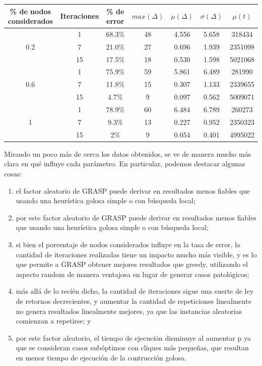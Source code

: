 \begin{center}
    \begin{tabular}{ | c | c | c | c | c | c | c |}
        \hline
        \% de nodos considerados & Iteraciones & \% de error & $max(\Delta)$ & $\mu(\Delta)$ & $\sigma(\Delta)$ & $\mu(t)$ \\ \hline
         & 1 & 68.3\% & 48 & 4.556 & 5.658 & 318434 \\ \cline{2-7}
        0.2 & 7 & 21.0\% & 27 & 0.696 & 1.939 & 2351098\\ \cline{2-7}
         & 15 & 17.5\% & 18 & 0.530 & 1.598 & 5021068 \\ \hline
         & 1 & 75.9\% & 59 & 5.861 & 6.489 & 281990\\ \cline{2-7}
        0.6 & 7 & 11.8\% & 15 & 0.307 & 1.133 & 2339655 \\ \cline{2-7}
         & 15 & 4.7\% & 9 & 0.097 & 0.562 & 5009071 \\ \hline
         & 1 & 78.9\% & 60 & 6.484 & 6.789 & 260273 \\ \cline{2-7}
        1 & 7 & 9.3\% & 13 & 0.227 & 0.952 & 2350323 \\ \cline{2-7}
         & 15 & 2\% & 9 & 0.054 & 0.401 & 4995022 \\
        \hline
    \end{tabular}
\end{center}

Mirando un poco más de cerca los datos obtenidos, se ve de manera mucho más clara en qué influye cada parámetro. En particular, podemos destacar algunas cosas:

\begin{enumerate}
    \item el factor aleatorio de GRASP puede derivar en resultados menos fiables que usando una heurística golosa simple o con búsqueda local;
    \item por este factor aleatorio de GRASP puede derivar en resultados menos fiables que usando una heurística golosa simple o con búsqueda local;
	\item si bien el porcentaje de nodos considerados influye en la tasa de error, la cantidad de iteraciones realizadas tiene un impacto mucho más visible, y es lo que permite a GRASP obtener mejores resultados que greedy, utilizando el aspecto random de manera ventajosa en lugar de generar casos patológicos;
    \item más allá de lo recíén dicho, la cantidad de iteraciones sigue una suerte de ley de retornos decrecientes, y aumentar la cantidad de repeticiones linealmente no genera resultados linealmente mejores, ya que las instancias aleatorias comienzan a repetirse; y
    \item por este factor aleatorio, el tiempo de ejecución disminuye al aumentar p ya que se consideran casos subóptimos con cliques más pequeñas, que resultan en menor tiempo de ejecución de la contrucción golosa.
\end{enumerate}

